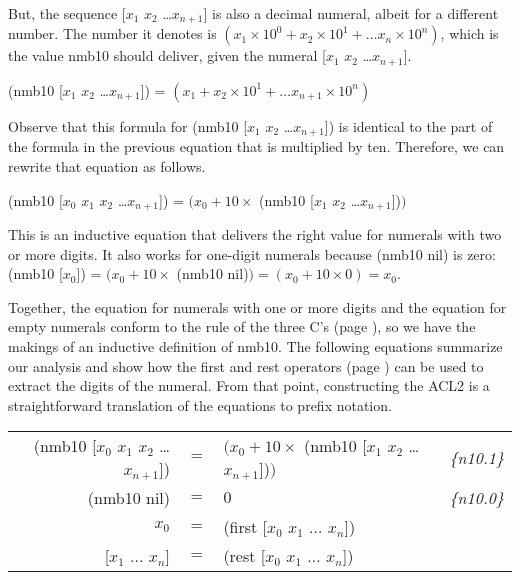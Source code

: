 But, the sequence [$x_1$ $x_2$ \dots $x_{n+1}$] is also a decimal numeral,
albeit for a different number.
The number it denotes is
$(x_1 \times 10^0 + x_2 \times 10^1 + \dots x_n \times 10^n)$,
which is the value nmb10 should deliver, given the numeral [$x_1$ $x_2$ \dots $x_{n+1}$].
\begin{center}
(nmb10 [$x_1$ $x_2$ \dots $x_{n+1}$]) = $(x_1 + x_2 \times 10^1 + \dots x_{n+1} \times 10^n)$
\end{center}

Observe that this formula for (nmb10 [$x_1$ $x_2$ \dots $x_{n+1}$]) is identical
to the part of the formula in the previous equation that is multiplied by ten.
Therefore, we can rewrite that equation as follows.
\begin{center}
(nmb10 [$x_0$ $x_1$ $x_2$ \dots $x_{n+1}$]) = $(x_0 + 10 \times$ (nmb10 [$x_1$ $x_2$ \dots $x_{n+1}$])$)$
\end{center}

This is an inductive equation that delivers the right value for
numerals with two or more digits. It also works
for one-digit numerals because (nmb10 nil) is zero:
(nmb10 [$x_0$]) = $(x_0 + 10 \times$ (nmb10 nil)$) = (x_0 + 10 \times 0) = x_0$.

Together, the equation for numerals with one or more digits
and the equation for empty numerals conform to the
rule of the three C's
(page \pageref{fig:inductive-def-keys}),
so we have the makings of an inductive definition of nmb10.
The following equations summarize our analysis and show how
the first and rest operators
(page \pageref{first-rest-cons}) can be used
to extract the digits of the numeral.
From that point, constructing the ACL2
is a straightforward translation of the equations to prefix notation.

\begin{center}
\begin{tabular}{rlll}
(nmb10 [$x_0$ $x_1$ $x_2$ \dots $x_{n+1}$]) & $=$ &$(x_0 + 10 \times$ (nmb10 [$x_1$ $x_2$ \dots $x_{n+1}$])$)$ &\emph{\{n10.1\}}\\
(nmb10 nil)                           & $=$ &$0$   &\emph{\{n10.0\}}\\
$x_0$                         & $=$ &(first [$x_0$ $x_1$ $\dots$ $x_n$]) &\\
{[$x_1$ $\dots$ $x_n$]}       & $=$ &(rest  [$x_0$ $x_1$ $\dots$ $x_n$]) &\\ %
\end{tabular}
\end{center}

